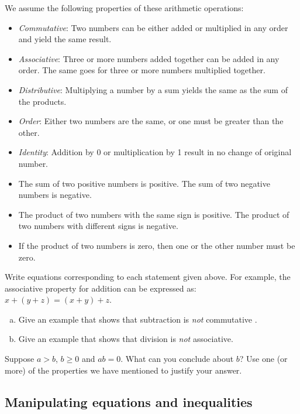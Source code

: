 We assume the following properties of these arithmetic operations:

\begin{itemize}
\item
\emph{Commutative}:  Two numbers can be either added or multiplied in any order and yield the same result.
\item
\emph{Associative}:  Three or more numbers added together can be added in any order.  The same goes for three or more numbers multiplied together.
\item
\emph{Distributive}:   Multiplying a number by a sum yields the same as the sum of the products.
\item
\emph{Order}:   Either two numbers are the same, or one must be greater than the other.
\item
\emph{Identity}:   Addition by 0 or multiplication by 1 result in no change of original number.
\item
The sum of two  positive numbers  is positive. The sum of two negative numbers is negative.
\item
The product of two  numbers with the same sign is positive. The product of two numbers with different signs is negative.
\item
If  the product of two numbers is zero, then one or the other number must be zero.
\end {itemize}

\begin{exercise}\label{exercise:BeforeWeBegin:1}
Write equations corresponding to each statement  given above. For example, the associative property for addition can be expressed as: $x + (y+z) = (x+y)+z$.
\end{exercise}
\begin{exercise}\label{exercise:BeforeWeBegin:2}
\begin{enumerate}[(a)]
\item
Give an example that shows that subtraction is \emph{not} commutative 
.\item
Give an example that shows that division is \emph{not} associative. 
\end{enumerate}
\end{exercise}
\begin{exercise}\label{exercise:BeforeWeBegin:3}
Suppose $a > b$,  $b \ge 0$ and $ab = 0$.  What can you conclude about $b$? Use one (or more)  of the properties we have mentioned to justify your answer.
\end{exercise}

\subsection {Manipulating equations and inequalities}

